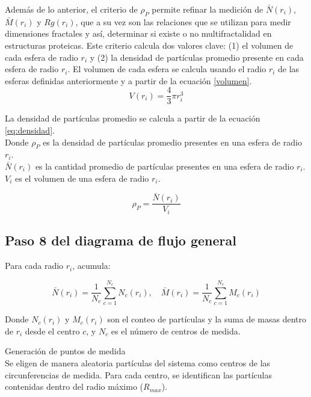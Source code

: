 	  Además de lo anterior, el criterio de \(\rho_{P}\) permite refinar la medici\'{o}n de \( \bar{N}(r_i) \), \( \bar{M}(r_i)\) y \({Rg}(r_i)\), que a su vez son las relaciones que se utilizan para medir dimensiones fractales y as\'{i}, determinar si existe o no multifractalidad en estructuras proteicas. Este criterio calcula dos valores clave: (1) el volumen de cada esfera de radio \(r_i\) y (2) la densidad de partículas promedio presente en cada esfera de radio \(r_i\). El volumen de cada esfera se calcula usando el radio \(r_i\) de las esferas definidas anteriormente y a partir de la ecuaci\'{o}n \ref{volumen}.\\
	 
	 
	 \begin{equation}
	 	V(r_i) = \frac{4}{3} \pi r_{i}^{3}
	 	\label{volumen}
	 \end{equation}
	 
	 La densidad de part\'{i}culas promedio se calcula a partir de la ecuaci\'{o}n \ref{eq:densidad}. \\
	 Donde \(\rho_{P}\) es la densidad de part\'{i}culas promedio presentes en una esfera de radio \(r_i\).\\
	 \(\bar N(r_{i})\) es la cantidad promedio de part\'{i}culas presentes en una esfera de radio \(r_i\).
	 \(V_{i}\) es el volumen de una esfera de radio \(r_{i}\).
	 
	 \begin{equation}
	 	\rho_P = \frac{\bar N(r_{i})}{V_{i}}
	 	\label{eq:densidad}
	 \end{equation}
	 

	\subsection{Paso 8 del diagrama de flujo general}
 
	Para cada radio \(r_i\), acumula:
	
	\begin{equation}
			\bar{N}(r_i) = \frac{1}{N_c} \sum_{c=1}^{N_c} N_c(r_i), \quad
		\bar{M}(r_i) = \frac{1}{N_c} \sum_{c=1}^{N_c} M_c(r_i)
	\end{equation}

	Donde \(N_c(r_i)\) y \(M_c(r_i)\) son el conteo de partículas y la suma de masas 
	dentro de \(r_i\) desde el centro \(c\), y \(N_c\) es el número de centros de medida.

	 Generaci\'{o}n de puntos de medida\\
	Se eligen de manera aleatoria part\'{i}culas del sistema como centros de las circunferencias de medida. Para cada centro, se identifican las part\'{i}culas contenidas dentro del radio m\'{a}ximo (\(R_{max}\)).
	
